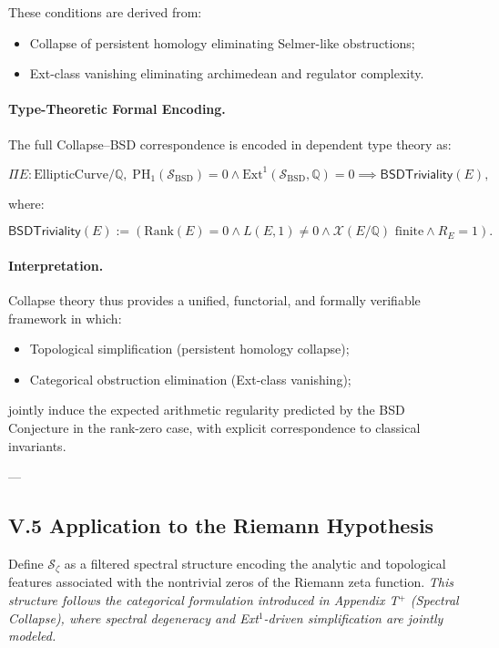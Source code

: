 \documentclass[11pt]{article}
\newcommand{\Sha}{\mathcal{X}}
\begin{document}
These conditions are derived from:
\begin{itemize}
    \item Collapse of persistent homology eliminating Selmer-like obstructions;
    \item Ext-class vanishing eliminating archimedean and regulator complexity.
\end{itemize}


\paragraph{Type-Theoretic Formal Encoding.}

The full Collapse--BSD correspondence is encoded in dependent type theory as:

\[
\Pi E : \mathrm{EllipticCurve}/\mathbb{Q},\;
\mathrm{PH}_1(\mathcal{S}_{\mathrm{BSD}}) = 0 \wedge \mathrm{Ext}^1(\mathcal{S}_{\mathrm{BSD}}, \mathbb{Q}) = 0
\implies
\mathsf{BSDTriviality}(E),
\]

where:

\[
\mathsf{BSDTriviality}(E) := \left( \mathrm{Rank}(E) = 0 \wedge L(E, 1) \neq 0 \wedge \Sha(E/\mathbb{Q}) \text{ finite} \wedge R_E = 1 \right).
\]

\paragraph{Interpretation.}

Collapse theory thus provides a unified, functorial, and formally verifiable framework in which:

\begin{itemize}
    \item Topological simplification (persistent homology collapse);
    \item Categorical obstruction elimination (Ext-class vanishing);
\end{itemize}

jointly induce the expected arithmetic regularity predicted by the BSD Conjecture in the rank-zero case, with explicit correspondence to classical invariants.

---

\subsection*{V.5 Application to the Riemann Hypothesis}

Define $\mathcal{S}_{\zeta}$ as a filtered spectral structure encoding the analytic and topological features associated with the nontrivial zeros of the Riemann zeta function.  
\textit{This structure follows the categorical formulation introduced in Appendix T$^{+}$ (Spectral Collapse), where spectral degeneracy and Ext$^1$-driven simplification are jointly modeled.}
\end{document}
